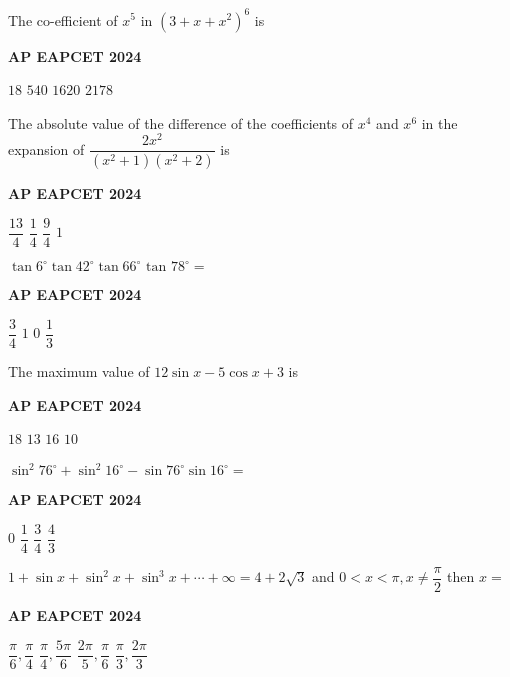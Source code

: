 \documentclass[11pt,paper=a4,answers]{exam}
\begin{document}
\begin{multicols}{2}
\begin{questions}
\question
The co-efficient of $x^5$ in $\left(3+x+x^2\right)^6$ is
\begin{flushright}
\small\textbf{AP EAPCET 2024}
\end{flushright}
\begin{choices}
  \choice $18$ 
  \choice $540$ 
  \choice $1620$ 
  \choice $2178$ 
\end{choices}

\question
The absolute value of the difference of the coefficients of $x^4$ and $x^6$ in the expansion of $\dfrac{2 x^2}{\left(x^2+1\right)\left(x^2+2\right)}$ is
\begin{flushright}
\small\textbf{AP EAPCET 2024}
\end{flushright}
\begin{choices}
  \choice $\dfrac{13}{4}$
  \choice $\dfrac{1}{4}$
  \choice $\dfrac{9}{4}$ 
  \choice $1$ 
\end{choices}


\question
$\tan 6^{\circ} \tan 42^{\circ} \tan 66^{\circ} \text { tan } 78^{\circ}=$
\begin{flushright}
\small\textbf{AP EAPCET 2024}
\end{flushright}
\begin{choices}
  \choice $\dfrac{3}{4}$
  \choice $1$ 
  \choice $0$ 
  \choice $\dfrac{1}{3}$ 
\end{choices}


\question
The maximum value of $12 \sin x-5 \cos x+3$ is
\begin{flushright}
\small\textbf{AP EAPCET 2024}
\end{flushright}
\begin{choices}
  \choice $18$ 
  \choice $13$ 
  \choice $16$ 
  \choice $10$ 
\end{choices}


\question
$\sin ^2 76^{\circ}+\sin ^2 16^{\circ}-\sin 76^{\circ} \sin 16^{\circ}=$
\begin{flushright}
\small\textbf{AP EAPCET 2024}
\end{flushright}
\begin{choices}
  \choice $0$ 
  \choice  $\dfrac{1}{4}$ 
  \choice  $\dfrac{3}{4}$
  \choice  $\dfrac{4}{3}$
\end{choices}


\question
$1+\sin x+\sin ^2 x+\sin ^3 x+\cdots+\infty=4+2 \sqrt{3}$ and $0<x<\pi, x \neq \dfrac{\pi}{2}$ then $x=$
\begin{flushright}
\small\textbf{AP EAPCET 2024}
\end{flushright}
\begin{choices}
  \choice $\dfrac{\pi}{6}, \dfrac{\pi}{4}$
  \choice $\dfrac{\pi}{4}, \dfrac{5 \pi}{6}$
  \choice $\dfrac{2 \pi}{5}, \dfrac{\pi}{6}$
  \choice $\dfrac{\pi}{3}, \dfrac{2 \pi}{3}$
\end{choices}




\end{questions}
\end{multicols}
\end{document}
